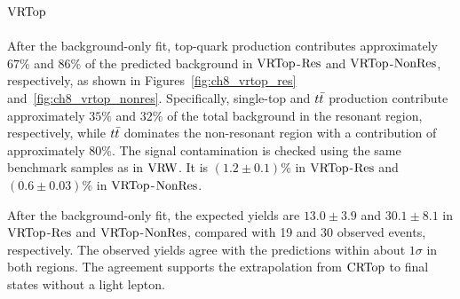 \subsection[VRTop]{$\mathrm{VRTop}$}
\label{subsec:ch8_vrtop}

After the background-only fit, top-quark production contributes approximately $67\%$ and $86\%$ of the predicted background in $\mathrm{VRTop}$-$\mathrm{Res}$ and $\mathrm{VRTop}$-$\mathrm{NonRes}$, respectively, as shown in Figures~\ref{fig:ch8_vrtop_res} and~\ref{fig:ch8_vrtop_nonres}.
Specifically, single-top and $t\bar{t}$ production contribute approximately $35\%$ and $32\%$ of the total background in the resonant region, respectively, while $t\bar{t}$ dominates the non-resonant region with a contribution of approximately $80\%$.
The signal contamination is checked using the same benchmark samples as in $\mathrm{VRW}$. It is $(1.2\pm0.1)\%$ in $\mathrm{VRTop}$-$\mathrm{Res}$ and $(0.6\pm0.03)\%$ in $\mathrm{VRTop}$-$\mathrm{NonRes}$.

After the background-only fit, the expected yields are $13.0\pm3.9$ and $30.1\pm8.1$ in $\mathrm{VRTop}$-$\mathrm{Res}$ and $\mathrm{VRTop}$-$\mathrm{NonRes}$, compared with 19 and 30 observed events, respectively. The observed yields agree with the predictions within about $1\sigma$ in both regions.
The agreement supports the extrapolation from $\mathrm{CRTop}$ to final states without a light lepton.


\clearpage
